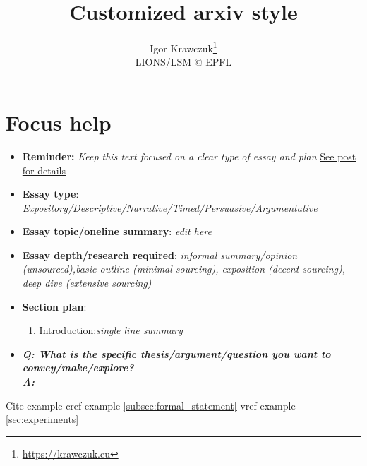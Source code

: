 \documentclass{article}
\title{Customized arxiv style}
\author{
    Igor Krawczuk\thanks{\url{https://krawczuk.eu}}\\
    LIONS/LSM @ EPFL
}
\begin{document}

\maketitle
\listoftodos

\begin{abstract}
\lipsum[1]
\end{abstract}



\section*{Focus help}
\begin{itemize}
  \item \textbf{Reminder:} \emph{Keep this text focused on a clear type of essay and plan} \href{https://brilliantio.com/how-to-focus-on-writing-an-essay/}{See post for details}
  \item \textbf{Essay type}: \emph{Expository/Descriptive/Narrative/Timed/Persuasive/Argumentative}
  \item \textbf{Essay topic/oneline summary}: \emph{edit here}
  \item \textbf{Essay depth/research required}: \emph{informal summary/opinion (unsourced),basic outline (minimal sourcing), exposition (decent sourcing), deep dive (extensive sourcing)}
  \item 	\textbf{Section plan}:
    \begin{enumerate}
      \item Introduction:\emph{single line summary}
    \end{enumerate}
  \item \textbf{\emph{Q: What is the specific thesis/argument/question you want to convey/make/explore?\\A:}}
\end{itemize}
Cite example \cite{kour2014real} cref example \cref{subsec:formal_statement} vref example \vref{sec:experiments}





\printbibliography
\printglossaries
\end{document}
